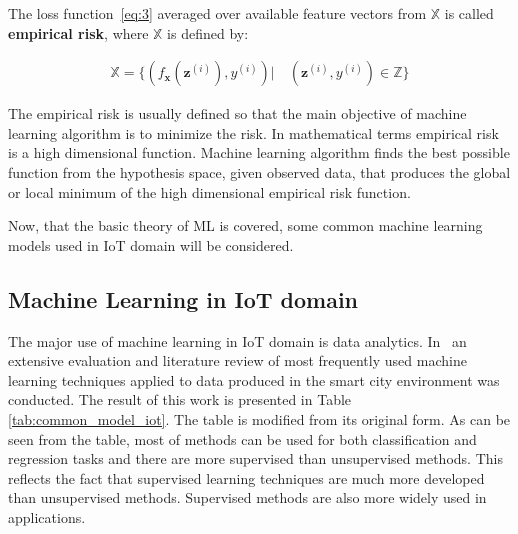 \documentclass[english, 12pt, a4paper, elec, utf8, online]{aaltothesis}
\begin{document}
The loss function~\ref{eq:3} averaged over available feature vectors from $\mathbb{X}$ is called \textbf{empirical risk}, where $\mathbb{X}$ is defined by:

\begin{align}\label{eq:4}
\mathbb{X} =  \{ (f_{\mathbf{x}}(\mathbf{z}^{(i)}), y^{(i)})|\quad (\mathbf{z}^{(i)},y^{(i)}) \in \mathbb{Z} \}
\end{align}

The empirical risk is usually defined so that the main objective of machine learning algorithm is to minimize the risk. In mathematical terms empirical risk is a high dimensional function. Machine learning algorithm finds the best possible function from the hypothesis space, given observed data, that produces the global or local minimum of the high dimensional empirical risk function.              

Now, that the basic theory of ML is covered, some common machine learning models used in IoT domain will be considered.            

\subsection{Machine Learning in IoT domain}\label{sec:ml_in_iot}
The major use of machine learning in IoT domain is data analytics. In~\cite{mahdavinejad2017machine} an extensive evaluation and literature review of most frequently used machine learning techniques applied to data produced in the smart city environment was conducted. The result of this work is presented in Table \ref{tab:common_model_iot}. The table is modified from its original form. As can be seen from the table, most of methods can be used for both classification and regression tasks and there are more supervised than unsupervised methods. This reflects the fact that supervised learning techniques are much more developed than unsupervised methods. Supervised methods are also more widely used in applications.    
\end{document}
